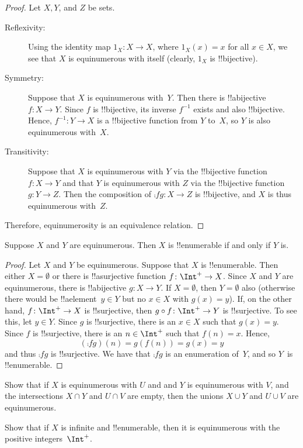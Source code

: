 \documentclass[../../../include/open-logic-section]{subfiles}
\begin{document}
\begin{proof} Let $X, Y$, and $Z$ be sets.

\begin{description}

\item[Reflexivity:] Using the identity map $1_X \colon X \to X$, where
  $1_X (x) = x$ for all $x \in X$, we see that $X$ is equinumerous
  with itself (clearly, $1_X$ is !!{bijective}).

\item[Symmetry:] Suppose that $X$ is equinumerous with~$Y$. Then there
  is !!a{bijective} $f\colon X \rightarrow Y$. Since $f$ is
  !!{bijective}, its inverse $f^{-1}$ exists and also
  !!{bijective}. Hence, $f^{-1}\colon Y \to X$ is a !!{bijective}
  function from $Y$ to~$X$, so $Y$ is also equinumerous with~$X$.

\item[Transitivity:] Suppose that $X$ is equinumerous with $Y$ via the
  !!{bijective} function~$f\colon X \to Y$ and that $Y$ is
  equinumerous with $Z$ via the !!{bijective} function~$g\colon Y \to
  Z$. Then the composition of $\comp{f}{g}\colon X \to Z$ is
  !!{bijective}, and $X$ is thus equinumerous with~$Z$.
\end{description}
Therefore, equinumerosity is an equivalence relation.
\end{proof}

\begin{thm}
Suppose $X$ and $Y$ are equinumerous. Then $X$ is !!{enumerable} if
and only if $Y$ is.
\end{thm}

\begin{proof}
Let $X$ and $Y$ be equinumerous.  Suppose that $X$ is
!!{enumerable}. Then either $X = \emptyset$ or there is
!!a{surjective} function $f\colon \Int^+ \to X$. Since $X$ and $Y$ are
equinumerous, there is !!a{bijective} $g\colon X \to Y$. If $X =
\emptyset$, then $Y = \emptyset$ also (otherwise there would be
!!a{element}~$y \in Y$ but no $x \in X$ with $g(x) = y$).  If, on the
other hand, $f\colon \Int^+ \to X$ is !!{surjective}, then
$\comp{f}{g} \colon \Int^+ \to Y$ is !!{surjective}. To see this, let
$y \in Y$. Since $g$ is !!{surjective}, there is an $x \in X$ such
that $g(x) = y$. Since $f$ is !!{surjective}, there is an $n \in \Int^+$
such that $f(n) = x$. Hence,
\[
(\comp{f}{g})(n) = g(f(n)) = g(x) = y
\]
and thus $\comp{f}{g}$ is !!{surjective}. We have that $\comp{f}{g}$
is an enumeration of~$Y$, and so $Y$~is !!{enumerable}.
\end{proof}

\begin{prob}
Show that if $X$ is equinumerous with $U$ and and $Y$ is equinumerous
with $V$, and the intersections $X \cap Y$ and $U \cap V$ are empty,
then the unions $X \cup Y$ and $U \cup V$ are equinumerous.
\end{prob}

\begin{prob}
Show that if $X$ is infinite and !!{enumerable}, then it is
equinumerous with the positive integers~$\Int^+$.
\end{prob}
\end{document}
